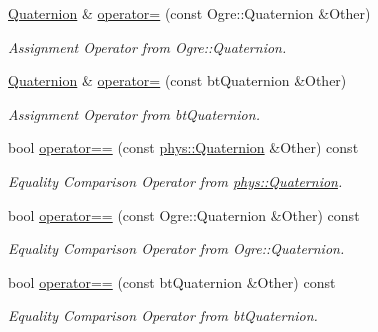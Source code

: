 \begin{DoxyCompactItemize}
\hyperlink{classphys_1_1Quaternion}{Quaternion} \& \hyperlink{classphys_1_1Quaternion_a6b9fe92548e3fd114d7419ddd5d5a660}{operator=} (const Ogre::Quaternion \&Other)
\begin{DoxyCompactList}\small\item\em Assignment Operator from Ogre::Quaternion. \item\end{DoxyCompactList}\item 
\hyperlink{classphys_1_1Quaternion}{Quaternion} \& \hyperlink{classphys_1_1Quaternion_a05e7364791bf7f38ad63dc59184cd5ca}{operator=} (const btQuaternion \&Other)
\begin{DoxyCompactList}\small\item\em Assignment Operator from btQuaternion. \item\end{DoxyCompactList}\item 
bool \hyperlink{classphys_1_1Quaternion_aa02dc20b4246e16017b70788449d7012}{operator==} (const \hyperlink{classphys_1_1Quaternion}{phys::Quaternion} \&Other) const 
\begin{DoxyCompactList}\small\item\em Equality Comparison Operator from \hyperlink{classphys_1_1Quaternion}{phys::Quaternion}. \item\end{DoxyCompactList}\item 
bool \hyperlink{classphys_1_1Quaternion_a75ab11099a0479885ae5f42945621ef9}{operator==} (const Ogre::Quaternion \&Other) const 
\begin{DoxyCompactList}\small\item\em Equality Comparison Operator from Ogre::Quaternion. \item\end{DoxyCompactList}\item 
bool \hyperlink{classphys_1_1Quaternion_a652ec257cb1ab788db646b85f3f89af3}{operator==} (const btQuaternion \&Other) const 
\begin{DoxyCompactList}\small\item\em Equality Comparison Operator from btQuaternion. \item\end{DoxyCompactList}\end{DoxyCompactItemize}
